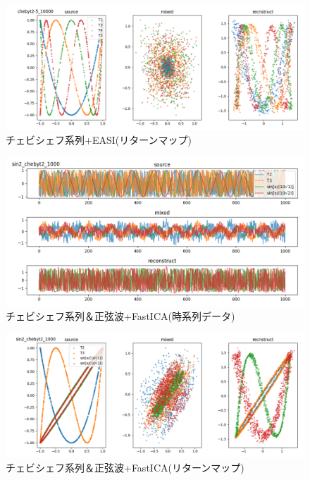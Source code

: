 \documentclass{jsarticle}
\begin{document}
\begin{figure}[H]
    \begin{center}
        \includegraphics[width=13cm]{img/cyebit-easi.png}
        \caption{チェビシェフ系列+EASI(リターンマップ)}
        \label{img:cyebit-easi}
    \end{center}
\end{figure}
\begin{figure}[H]
    \begin{center}
        \includegraphics[width=13cm]{img/sinchebyt-plot-fastica.png}
        \caption{チェビシェフ系列＆正弦波+FastICA(時系列データ)}
        \label{img:sinchebyt-plot-fastica}
    \end{center}
\end{figure}
\begin{figure}[H]
    \begin{center}
        \includegraphics[width=13cm]{img/sinchebyt-ret-fastica.png}
        \caption{チェビシェフ系列＆正弦波+FastICA(リターンマップ)}
        \label{img:sinchebyt-ret-fastica}
    \end{center}
\end{figure}
\end{document}
